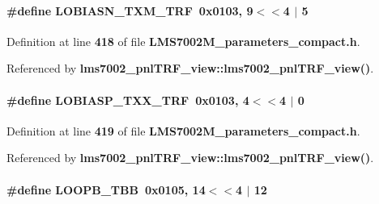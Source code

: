 \paragraph[{L\+O\+B\+I\+A\+S\+N\+\_\+\+T\+X\+M\+\_\+\+T\+RF}]{\setlength{\rightskip}{0pt plus 5cm}\#define L\+O\+B\+I\+A\+S\+N\+\_\+\+T\+X\+M\+\_\+\+T\+RF~0x0103, 9$<$$<$4 $\vert$  5}\label{LMS7002M__parameters__compact_8h_a5718d05e7eabc2fcb474117fcda3192c}


Definition at line {\bf 418} of file {\bf L\+M\+S7002\+M\+\_\+parameters\+\_\+compact.\+h}.



Referenced by {\bf lms7002\+\_\+pnl\+T\+R\+F\+\_\+view\+::lms7002\+\_\+pnl\+T\+R\+F\+\_\+view()}.

\paragraph[{L\+O\+B\+I\+A\+S\+P\+\_\+\+T\+X\+X\+\_\+\+T\+RF}]{\setlength{\rightskip}{0pt plus 5cm}\#define L\+O\+B\+I\+A\+S\+P\+\_\+\+T\+X\+X\+\_\+\+T\+RF~0x0103, 4$<$$<$4 $\vert$  0}\label{LMS7002M__parameters__compact_8h_aa48a8ca0b0f76d83a8dd710a9da5e2dc}


Definition at line {\bf 419} of file {\bf L\+M\+S7002\+M\+\_\+parameters\+\_\+compact.\+h}.



Referenced by {\bf lms7002\+\_\+pnl\+T\+R\+F\+\_\+view\+::lms7002\+\_\+pnl\+T\+R\+F\+\_\+view()}.

\paragraph[{L\+O\+O\+P\+B\+\_\+\+T\+BB}]{\setlength{\rightskip}{0pt plus 5cm}\#define L\+O\+O\+P\+B\+\_\+\+T\+BB~0x0105, 14$<$$<$4 $\vert$  12}\label{LMS7002M__parameters__compact_8h_aa6110ad5ad034f48c4bb43d4a613f9a4}


